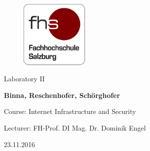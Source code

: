 
\begin{titlepage}

\hspace{7cm}

\begin{figure}[!ht]
	\centering
	\includegraphics[width=0.3\textwidth]{fhs_logo_web.png}
\end{figure}

\begin{center}
	\vspace{2cm}
	\Huge Laboratory II
	
	\Large{\bf\large Binna, Reschenhofer, Schörghofer}
	\vspace{1cm}

	\large Course: Internet Infrastructure and Security 
	
	\large Lecturer: FH-Prof. DI Mag. Dr. Dominik Engel 
	
	\large 23.11.2016
\end{center}

\end{titlepage}